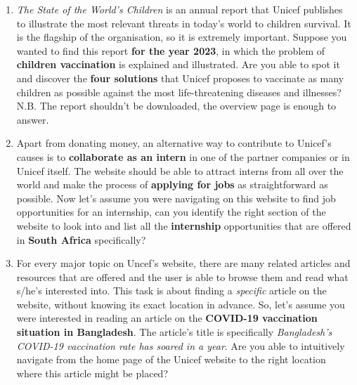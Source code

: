 \documentclass[11pt]{article}
\begin{document}
\begin{Form}
\begin{enumerate}
		\item \textit{The State of the World's Children} is an annual report that Unicef publishes to illustrate the most relevant threats in today's world to children survival. It is the flagship of the organisation, so it is extremely important. Suppose you wanted to find this report \textbf{for the year 2023}, in which the problem of \textbf{children vaccination} is explained and illustrated. Are you able to spot it and discover the \textbf{four solutions} that Unicef proposes to vaccinate as many children as possible against the most life-threatening diseases and illnesses?\\
		N.B. The report shouldn't be downloaded, the overview page is enough to answer.
		
		\item Apart from donating money, an alternative way to contribute to Unicef's causes is to \textbf{collaborate as an intern} in one of the partner companies or in Unicef itself. The website should be able to attract interns from all over the world and make the process of \textbf{applying for jobs} as straightforward as possible. Now let's assume you were navigating on this website to find job opportunities for an internship, can you identify the right section of the website to look into and list all the \textbf{internship} opportunities that are offered in \textbf{South Africa} specifically?
		
		\item For every major topic on Uncef's website, there are many related articles and resources that are offered and the user is able to browse them and read what s/he's interested into. This task is about finding a \textit{specific} article on the website, without knowing its exact location in advance. So, let's assume you were interested in reading an article on the\textbf{ COVID-19 vaccination situation in Bangladesh}. The article's title is specifically \textit{Bangladesh's COVID-19 vaccination rate has soared in a year}. Are you able to intuitively navigate from the home page of the Unicef website to the right location where this article might be placed?
		
		
	\end{enumerate}
			

	
	\end{Form}
	
	\clearpage
	
	
\end{document}
